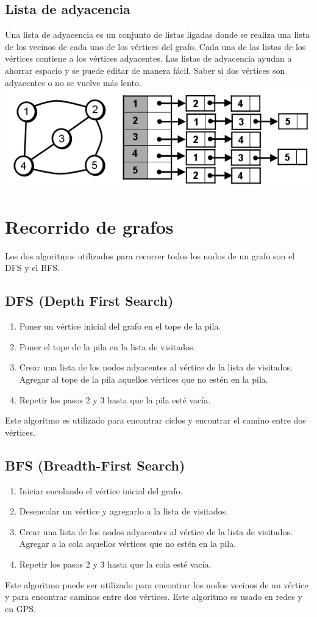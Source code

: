 \documentclass[twocolumn]{article}
\begin{document}
\subsection{Lista de adyacencia}
Una lista de adyacencia es un conjunto de listas ligadas donde se realiza una lista de los vecinos de cada uno de los vértices del grafo. Cada una de las listas de los vértices contiene a los vértices adyacentes.
Las listas de adyacencia ayudan a ahorrar espacio y se puede editar de manera fácil. Saber si dos vértices son adyacentes o no se vuelve más lento.
\cite{javatpoint}
\includegraphics[width = .45\textwidth]{imagenes/Listas_de_adyacencia.jpg}


\section{Recorrido de grafos}
Los dos algoritmos utilizados para recorrer todos los nodos de un grafo son el DFS y el BFS. 
\subsection{DFS (Depth First Search)}
\begin{enumerate}
    \item Poner un vértice inicial del grafo en el tope de la pila.
    \item Poner el tope de la pila en la lista de visitados.
    \item Crear una lista de los nodos adyacentes al vértice de la lista de visitados. Agregar al tope de la pila aquellos vértices que no estén en la pila.
    \item Repetir los pasos 2 y 3 hasta que la pila esté vacía.
\end{enumerate}
\cite{dfs}
Este algoritmo es utilizado para encontrar ciclos y encontrar el camino entre dos vértices.
\subsection{BFS (Breadth-First Search)}
\begin{enumerate}
    \item Iniciar encolando el vértice inicial del grafo.
    \item Desencolar un vértice y agregarlo a la lista de visitados.
    \item Crear una lista de los nodos adyacentes al vértice de la lista de visitados. Agregar a la cola aquellos vértices que no estén en la pila.
    \item Repetir los pasos 2 y 3 hasta que la cola esté vacía.
\end{enumerate}
\cite{bfs}
Este algoritmo puede ser utilizado para encontrar los nodos vecinos de un vértice y para encontrar caminos entre dos vértices. Este algoritmo es usado en redes y en GPS. \cite{aplicaciones}



\end{document}
